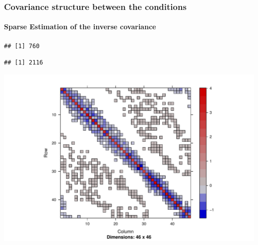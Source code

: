 \begin{frame}
\frametitle{Covariance structure between the conditions}
\framesubtitle{Sparse Estimation of the inverse covariance}

\begin{knitrout}\scriptsize
{}\color{fgcolor}\begin{kframe}
\begin{alltt}
\hlstd{(}\hlopt{$} \hlopt{!=} \hlstd{)}
\end{alltt}
\begin{verbatim}
## [1] 760
\end{verbatim}
\begin{alltt}
\hlopt{$} \hlopt{**} 
\end{alltt}
\begin{verbatim}
## [1] 2116
\end{verbatim}
\begin{alltt}
\hlopt{$}
\end{alltt}
\end{kframe}
\includegraphics[width=.8\textwidth]{figures/r_show_plasmodium_glasso-1} 

\end{knitrout}

\end{frame}

